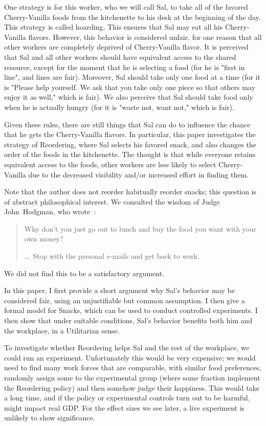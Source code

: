 \documentclass[twocolumn]{article}
\begin{document}
One strategy is for this worker, who we will call Sal, to take all of the favored Cherry-Vanilla foods from the kitchenette to his desk at the beginning of the day. This strategy is called hoarding. This ensures that Sal may eat all his Cherry-Vanilla flavors. However, this behavior is considered unfair, for one reason that all other workers are completely deprived of Cherry-Vanilla flavor. It is perceived that Sal and all other workers should have equivalent access to the shared resource, except for the moment that he is selecting a food (for he is "first in line", and lines are fair). Moreover, Sal should take only one food at a time (for it is "Please help yourself. We ask that you take only one piece so that others may enjoy it as well," which is fair). We also perceive that Sal should take food only when he is actually hungry (for it is "waste not, want not," which is fair).

Given these rules, there are still things that Sal can do to influence the chance that he gets the Cherry-Vanilla flavors. In particular, this paper investigates the strategy of Reordering, where Sal selects his favored snack, and also changes the order of the foods in the kitchenette. The thought is that while everyone retains equivalent access to the foods, other workers are less likely to select Cherry-Vanilla due to the decreased visibility and/or increased effort in finding them.

Note that the author does not reorder habitually reorder snacks; this question is of abstract philosophical interest. We consulted the wisdom of Judge John~Hodgman, who wrote~\cite{hodgman2016snacks}:

\begin{quotation}
  \noindent Why don't you just go out to lunch and buy the food you want with
  your own money?
  
  \noindent \ldots\ Stop with the personal e-mails and get back to work.
\end{quotation}

We did not find this to be a satisfactory argument.

\smallskip
In this paper, I first provide a short argument why Sal's behavior may be considered fair, using an unjustifiable but common assumption. I then give a formal model for Snacks, which can be used to conduct controlled experiments. I then show that under suitable conditions, Sal's behavior benefits both him and the workplace, in a Utilitarian sense.

To investigate whether Reordering helps Sal and the rest of the workplace, we could run an experiment. Unfortunately this would be very expensive; we would need to find many work forces that are comparable, with similar food preferences, randomly assign some to the experimental group (where some fraction implement the Reordering policy) and then somehow judge their happiness. This would take a long time, and if the policy or experimental controls turn out to be harmful, might impact real GDP. For the effect sizes we see later, a live experiment is unlikely to show significance.
\end{document}
